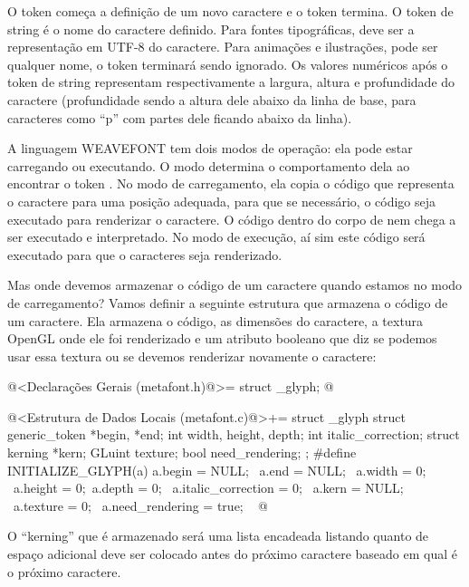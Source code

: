 {{{{{{O token  começa a definição de um novo caractere
e o token  termina. O token de string é o nome do
caractere definido. Para fontes tipográficas, deve ser a representação
em UTF-8 do caractere. Para animações e ilustrações, pode ser qualquer
nome, o token terminará sendo ignorado. Os valores numéricos após o
token de string representam respectivamente a largura, altura e
profundidade do caractere (profundidade sendo a altura dele abaixo da
linha de base, para caracteres como ``p'' com partes dele ficando
abaixo da linha).

A linguagem WEAVEFONT tem dois modos de operação: ela pode estar
carregando ou executando. O modo determina o comportamento dela ao
encontrar o token . No modo de carregamento, ela
copia o código que representa o caractere para uma posição adequada,
para que se necessário, o código seja executado para renderizar o
caractere. O código dentro do corpo de  nem
chega a ser executado e interpretado. No modo de execução, aí sim este
código será executado para que o caracteres seja renderizado.


Mas onde devemos armazenar o código de um caractere quando estamos no
modo de carregamento? Vamos definir a seguinte estrutura que armazena
o código de um caractere. Ela armazena o código, as dimensões do
caractere, a textura OpenGL onde ele foi renderizado e um atributo
booleano que diz se podemos usar essa textura ou se devemos renderizar
novamente o caractere:

\iniciocodigo
@<Declarações Gerais (metafont.h)@>=
struct _glyph;
@
\fimcodigo

\iniciocodigo
@<Estrutura de Dados Locais (metafont.c)@>+=
struct _glyph{
  struct generic_token *begin, *end;
  int width, height, depth;
  int italic_correction;
  struct kerning *kern;
  GLuint texture;
  bool need_rendering;
};
#define INITIALIZE_GLYPH(a) {a.begin = NULL; \
                            a.end = NULL; \
                            a.width = 0; \
                            a.height = 0;\
                            a.depth = 0; \
                            a.italic_correction = 0; \
                            a.kern = NULL; \
                            a.texture = 0; \
                            a.need_rendering = true; \
                            }
@
\fimcodigo

O ``kerning'' que é armazenado será uma lista encadeada listando
quanto de espaço adicional deve ser colocado antes do próximo
caractere baseado em qual é o próximo caractere.

}}}}}}
